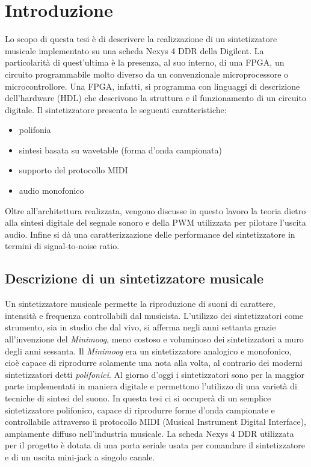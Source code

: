 \chapter{Introduzione}
Lo scopo di questa tesi è di descrivere la realizzazione di un sintetizzatore
musicale implementato su una scheda Nexys 4 DDR della Digilent.
La particolarità di quest'ultima è la presenza, al suo interno, di una FPGA,
un circuito programmabile molto diverso da un convenzionale microprocessore
o microcontrollore.
Una FPGA, infatti, si programma con linguaggi di descrizione dell'hardware (HDL)
che descrivono la struttura e il funzionamento di un circuito digitale.
Il sintetizzatore presenta le seguenti caratteristiche:
\begin{itemize}
   \item polifonia
   \item sintesi basata su wavetable (forma d'onda campionata)
   \item supporto del protocollo MIDI
   \item audio monofonico
\end{itemize}

Oltre all'architettura realizzata, vengono discusse in questo lavoro la teoria
dietro alla sintesi digitale del segnale sonoro e della PWM utilizzata
per pilotare l'uscita audio.
Infine si dà una caratterizzazione delle performance del sintetizzatore in termini
di signal-to-noise ratio.

\section{Descrizione di un sintetizzatore musicale}
Un sintetizzatore musicale permette la riproduzione di suoni di carattere, intensità e frequenza controllabili dal musicista.
L'utilizzo dei sintetizzatori come strumento, sia in studio che dal vivo, si afferma negli anni settanta grazie all'invenzione del \textit{Minimoog}, meno costoso e voluminoso dei sintetizzatori a muro degli anni sessanta.
Il \textit{Minimoog} era un sintetizzatore analogico e monofonico, cioè capace di riprodurre solamente una nota alla volta, al contrario dei moderni sintetizzatori detti \textit{polifonici}.
Al giorno d'oggi i sintetizzatori sono per la maggior parte implementati in maniera digitale e permettono l'utilizzo di una varietà di tecniche di sintesi del suono.
In questa tesi ci si occuperà di un semplice sintetizzatore polifonico, capace di riprodurre forme d'onda campionate e controllabile attraverso il protocollo MIDI (Musical Instrument Digital Interface), ampiamente diffuso nell'industria musicale.
La scheda Nexys 4 DDR utilizzata per il progetto è dotata di una porta seriale usata per comandare il sintetizzatore
 e di un uscita mini-jack a singolo canale.

